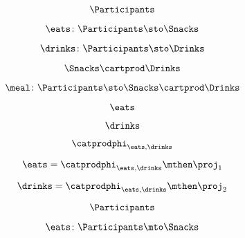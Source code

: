 \begin{forslides}
    \begin{equation}
        \label{eq:feedback-041}
        \Participants
    \end{equation}

    \begin{equation}
        \label{eq:feedback-042}
        \eats \colon \Participants \sto \Snacks
    \end{equation}

    \begin{equation}
        \label{eq:feedback-043}
        \drinks \colon  \Participants \sto \Drinks
    \end{equation}

    \begin{equation}
        \label{eq:feedback-044}
        \Snacks\cartprod \Drinks
    \end{equation}

    \begin{equation}
        \label{eq:feedback-045}
        \meal \colon \Participants\sto \Snacks\cartprod \Drinks
    \end{equation}

    \begin{equation}
        \label{eq:feedback-046}
        \eats
    \end{equation}

    \begin{equation}
        \label{eq:feedback-047}
        \drinks
    \end{equation}

    \begin{equation}
        \label{eq:feedback-048}
        \catprodphi_{\eats,\drinks}
    \end{equation}

    \begin{equation}
        \label{eq:feedback-049}
        \eats =\catprodphi_{\eats,\drinks}\mthen \proj_1
    \end{equation}

    \begin{equation}
        \label{eq:feedback-050}
        \drinks=\catprodphi_{\eats,\drinks}\mthen \proj_2
    \end{equation}

    \begin{equation}
        \label{eq:feedback-051}
        \Participants
    \end{equation}

    \begin{equation}
        \label{eq:feedback-052}
        \eats\colon \Participants \mto \Snacks
    \end{equation}


\end{forslides}
